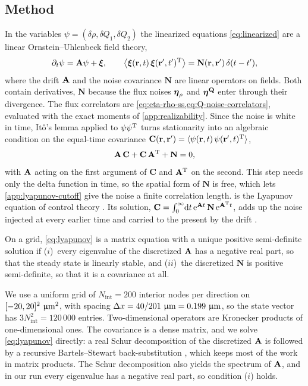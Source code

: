 \documentclass[aps,pre,reprint,superscriptaddress,longbibliography,nofootinbib
]{revtex4-2}
\begin{document}
\subsection{Method}
\label{app:lyapunov-method}
In the variables $\psi=(\delta\rho,\delta Q_1,\delta Q_2)$
the linearized equations \cref{eq:linearized} are a linear
Ornstein--Uhlenbeck field theory,
\begin{equation}
  \label{eq:ou-model}
  \partial_t\psi=\mathbf{A}\psi+\boldsymbol{\xi},
  \qquad
  \left\langle\boldsymbol{\xi}(\mathbf{r},t)\,\boldsymbol{\xi}(\mathbf{r}',t')^{\mathrm{T}}\right\rangle=\mathbf N(\mathbf{r},\mathbf{r}')\,\delta(t-t'),
\end{equation}
where the drift $\mathbf{A}$ and the noise covariance $\mathbf N$
are linear operators on fields. Both contain derivatives,
$\mathbf N$ because the flux noises $\boldsymbol\eta_\rho$ and
$\boldsymbol\eta^{\mathbf{Q}}$ enter through their divergence. The flux
correlators are
\cref{eq:eta-rho-ss,eq:Q-noise-correlators}, evaluated with
the exact moments of \cref{app:realizability}. Since the
noise is white in time, It\^o's lemma applied to
$\psi\psi^{\mathrm{T}}$ turns stationarity into an algebraic
condition on the equal-time covariance $\mathbf
C(\mathbf{r},\mathbf{r}')=\langle\psi(\mathbf{r},t)\,\psi(\mathbf{r}',t)^{\mathrm{T}}\rangle$,
\begin{equation}
  \label{eq:lyapunov}
  \mathbf{A}\,\mathbf C+\mathbf C\,\mathbf{A}^{\mathrm{T}}+\mathbf N=0,
\end{equation}
with $\mathbf{A}$ acting on the first argument of $\mathbf C$ and
$\mathbf{A}^{\mathrm{T}}$ on the second. This step needs only the delta
function in time, so the spatial form of $\mathbf N$ is
free, which lets \cref{app:lyapunov-cutoff} give the noise
a finite correlation length.  is the
Lyapunov equation of control theory
\cite{lyapunov1992general,zhou1996robust}. Its solution,
$\mathbf C=\int_0^\infty\!\mathrm{d} t\,\mathrm{e}^{\mathbf{A} t}\,\mathbf
N\,\mathrm{e}^{\mathbf{A}^{\mathrm{T}} t}$, adds up the noise injected at every
earlier time and carried to the present by the drift
\cite{zhou1996robust,simoncini2016computational}.

On a grid, \cref{eq:lyapunov} is a matrix equation with a
unique positive semi-definite solution if ($i$)~every
eigenvalue of the discretized $\mathbf{A}$ has a negative real
part, so that the steady state is linearly stable, and
($ii$)~the discretized $\mathbf N$ is positive
semi-definite, so that it is a covariance at all.

We use a uniform grid of $N_\mathrm{int}=200$ interior
nodes per direction on $[-20,20]^2~\upmu\mathrm{m}^2$, with spacing
$\Delta x=40/201~\upmu\mathrm{m}=0.199~\upmu\mathrm{m}$, so the state
vector has $3N_\mathrm{int}^2=120\,000$ entries.
Two-dimensional operators are Kronecker products of
one-dimensional ones. The covariance is a dense matrix, and
we solve \cref{eq:lyapunov} directly: a real Schur
decomposition of the discretized $\mathbf{A}$ is followed by a
recursive Bartels--Stewart back-substitution
\cite{bartels1972solution}, which keeps most of the work in
matrix products. The Schur decomposition also yields the
spectrum of $\mathbf{A}$, and in our run every eigenvalue has a
negative real part, so condition ($i$) holds.
\end{document}
